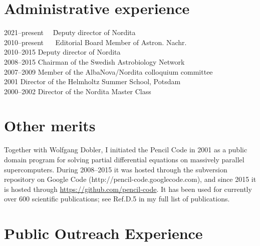 \documentclass{article}
\begin{document}

\section*{Administrative experience}

\begin{tabbing}
2021--present ~~\= Deputy director of Nordita \\
2010--present ~~\> Editorial Board Member of Astron. Nachr.\\
2010--2015      \> Deputy director of Nordita \\
2008--2015      \> Chairman of the Swedish Astrobiology Network \\
2007--2009      \> Member of the AlbaNova/Nordita colloquium committee\\
2001            \> Director of the Helmholtz Summer School, Potsdam \\
2000--2002      \> Director of the Nordita Master Class\\
\end{tabbing}
\vspace{-8mm}

\section*{Other merits}

Together with Wolfgang Dobler, I initiated the {\sc Pencil Code} in 2001
as a public domain program for solving partial differential equations
on massively parallel supercomputers.
During 2008--2015 it was hosted through the subversion repository on
Google Code (http://pencil-code.googlecode.com), and
since 2015 it is hosted through \url{https://github.com/pencil-code}.
It has been used for currently over 600 scientific publications; see Ref.D.5
in my full list of publications.

\section*{Public Outreach Experience}
\end{document}
